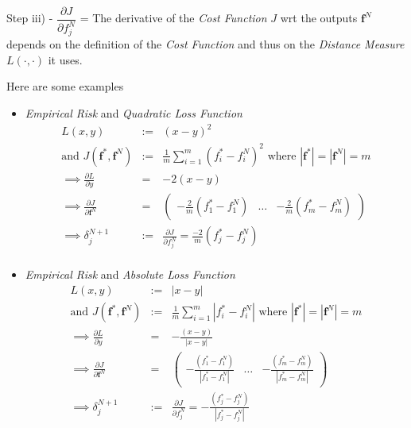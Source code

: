 \documentclass[11pt,a4paper]{article}
\begin{document}
  \begin{proposition}{Step iii) - $\dfrac{\partial J}{\partial f_j^N}$}
    \everymath={\displaystyle}
    The derivative of the \textit{Cost Function} $J$ wrt the outputs $\mathbf{f}^N$ depends on the definition of the \textit{Cost Function} and thus on the \textit{Distance Measure} $L(\cdot,\cdot)$ it uses.
    \par Here are some examples
    \begin{itemize}
      \item \textit{Empirical Risk} and \textit{Quadratic Loss Function}
      \[\begin{array}{rrl}
        L(x,y)&:=&(x-y)^2\\
        \text{and }J(\mathbf{f}^*,\mathbf{f}^N)&:=&\frac1m\sum_{i=1}^m(f_i^*-f_i^N)^2\text{ where }|\mathbf{f}^*|=|\mathbf{f}^N|=m\\
        \implies \frac{\partial L}{\partial y}&=&-2(x-y)\\
        \implies \frac{\partial J}{\partial \mathbf{f}^N}&=&\begin{pmatrix}
        -\frac2m(f_1^*-f_1^N)&\dots&-\frac2m(f_m^*-f_m^N)
        \end{pmatrix}\\
        \implies \delta_j^{N+1}&:=&\frac{\partial J}{\partial f_j^N}=\frac{-2}m(f_j^*-f_j^N)\\
      \end{array}\]
      \item \textit{Empirical Risk} and \textit{Absolute Loss Function}
      \[\begin{array}{rrl}
        L(x,y)&:=&|x-y|\\
        \text{and }J(\mathbf{f}^*,\mathbf{f}^N)&:=&\frac1m\sum_{i=1}^m|f_i^*-f_i^N|\text{ where }|\mathbf{f}^*|=|\mathbf{f}^N|=m\\
        \implies \frac{\partial L}{\partial y}&=&-\frac{(x-y)}{|x-y|}\\
        \implies \frac{\partial J}{\partial \mathbf{f}^N}&=&\begin{pmatrix}
        -\frac{(f_1^*-f_1^N)}{|f_1^*-f_1^N|}&\dots&-\frac{(f_m^*-f_m^N)}{|f_m^*-f_m^N|}
        \end{pmatrix}\\
        \implies \delta_j^{N+1}&:=&\frac{\partial J}{\partial f_j^N}=-\frac{(f_j^*-f_j^N)}{|f_j^*-f_j^N|}
      \end{array}\]
    \end{itemize}
  \end{proposition}
\end{document}
